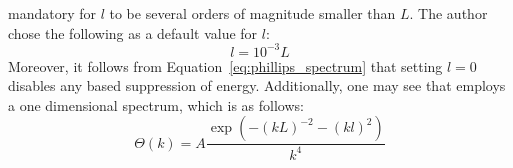 mandatory for $l$ to be several orders of magnitude smaller than $L$. The author
chose the following as a default value for $l$:
\begin{equation*}
 l = 10^{-3}L
\end{equation*}
Moreover, it follows from Equation~\ref{eq:phillips_spectrum} that setting 
${l = 0}$ disables any \wavenumber based suppression of energy. Additionally,
one may see that \citeauthor{course:simulatingocean} employs a one dimensional
\wavenumber spectrum, which is as follows:
\begin{equation}
\label{eq:phillips_wavenumber_spectrum}
  \Theta(k) = A\frac{\exp\left(-(kL)^{-2}-(kl)^2\right)}{k^4}
\end{equation}
%
